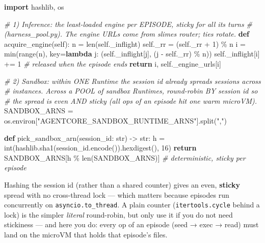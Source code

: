 \documentclass[
  paper=a4,
  ,captions=tableheading
]{scrartcl}
\newenvironment{Shaded}{}{}
\newcommand{\BuiltInTok}[1]{\textcolor[rgb]{0.00,0.50,0.00}{#1}}
\newcommand{\CommentTok}[1]{\textcolor[rgb]{0.38,0.63,0.69}{\textit{#1}}}
\newcommand{\ControlFlowTok}[1]{\textcolor[rgb]{0.00,0.44,0.13}{\textbf{#1}}}
\newcommand{\DecValTok}[1]{\textcolor[rgb]{0.25,0.63,0.44}{#1}}
\newcommand{\ImportTok}[1]{\textcolor[rgb]{0.00,0.50,0.00}{\textbf{#1}}}
\newcommand{\KeywordTok}[1]{\textcolor[rgb]{0.00,0.44,0.13}{\textbf{#1}}}
\newcommand{\NormalTok}[1]{#1}
\newcommand{\OperatorTok}[1]{\textcolor[rgb]{0.40,0.40,0.40}{#1}}
\newcommand{\StringTok}[1]{\textcolor[rgb]{0.25,0.44,0.63}{#1}}
\newcommand{\VariableTok}[1]{\textcolor[rgb]{0.10,0.09,0.49}{#1}}
\begin{document}
\begin{Shaded}
\begin{Highlighting}[]
\ImportTok{import}\NormalTok{ hashlib, os}

\CommentTok{\# 1) Inference: the least{-}loaded engine per EPISODE, sticky for all its turns}
\CommentTok{\#    (harness\_pool.py). The engine URLs come from slime\textquotesingle{}s router; ties rotate.}
\KeywordTok{def}\NormalTok{ acquire\_engine(}\VariableTok{self}\NormalTok{):}
\NormalTok{    n }\OperatorTok{=} \BuiltInTok{len}\NormalTok{(}\VariableTok{self}\NormalTok{.\_inflight)}
    \VariableTok{self}\NormalTok{.\_rr }\OperatorTok{=}\NormalTok{ (}\VariableTok{self}\NormalTok{.\_rr }\OperatorTok{+} \DecValTok{1}\NormalTok{) }\OperatorTok{\%}\NormalTok{ n}
\NormalTok{    i }\OperatorTok{=} \BuiltInTok{min}\NormalTok{(}\BuiltInTok{range}\NormalTok{(n), key}\OperatorTok{=}\KeywordTok{lambda}\NormalTok{ j: (}\VariableTok{self}\NormalTok{.\_inflight[j], (j }\OperatorTok{{-}} \VariableTok{self}\NormalTok{.\_rr) }\OperatorTok{\%}\NormalTok{ n))}
    \VariableTok{self}\NormalTok{.\_inflight[i] }\OperatorTok{+=} \DecValTok{1}                     \CommentTok{\# released when the episode ends}
    \ControlFlowTok{return}\NormalTok{ i, }\VariableTok{self}\NormalTok{.\_engine\_urls[i]}

\CommentTok{\# 2) Sandbox: within ONE Runtime the session id already spreads sessions across}
\CommentTok{\#    instances. Across a POOL of sandbox Runtimes, round{-}robin BY session id so}
\CommentTok{\#    the spread is even AND sticky (all ops of an episode hit one warm microVM).}
\NormalTok{SANDBOX\_ARNS }\OperatorTok{=}\NormalTok{ os.environ[}\StringTok{"AGENTCORE\_SANDBOX\_RUNTIME\_ARNS"}\NormalTok{].split(}\StringTok{","}\NormalTok{)}

\KeywordTok{def}\NormalTok{ pick\_sandbox\_arn(session\_id: }\BuiltInTok{str}\NormalTok{) }\OperatorTok{{-}\textgreater{}} \BuiltInTok{str}\NormalTok{:}
\NormalTok{    h }\OperatorTok{=} \BuiltInTok{int}\NormalTok{(hashlib.sha1(session\_id.encode()).hexdigest(), }\DecValTok{16}\NormalTok{)}
    \ControlFlowTok{return}\NormalTok{ SANDBOX\_ARNS[h }\OperatorTok{\%} \BuiltInTok{len}\NormalTok{(SANDBOX\_ARNS)]   }\CommentTok{\# deterministic, sticky per episode}
\end{Highlighting}
\end{Shaded}

Hashing the session id (rather than a shared counter) gives an even,
\textbf{sticky} spread with no cross-thread lock --- which matters
because episodes run concurrently on \texttt{asyncio.to\_thread}. A
plain counter (\texttt{itertools.cycle} behind a lock) is the simpler
\emph{literal} round-robin, but only use it if you do not need
stickiness --- and here you do: every op of an episode (seed → exec →
read) must land on the microVM that holds that episode's files.
\end{document}
